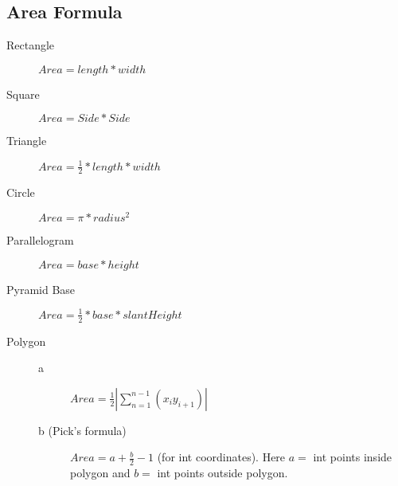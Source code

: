 \documentclass[10pt, a4paper]{article}
\begin{document}
\begin{multicols}{2}
\subsection{Area Formula}
\begin{description}
    \item[Rectangle] 
        \begin{math}
            Area = length * width
        \end{math}
    \item[Square] 
        \begin{math}
            Area = Side * Side
        \end{math}
    \item[Triangle] 
        \begin{math}
            Area = \frac{1}{2} * length * width
        \end{math}
    \item[Circle] 
        \begin{math}
            Area = \pi * radius^2
        \end{math}
    \item[Parallelogram] 
        \begin{math}
            Area = base * height
        \end{math}
    \item[Pyramid Base] 
        \begin{math}
            Area = \frac{1}{2} * base * slantHeight
        \end{math}
    \item[Polygon] \hfill
        \begin{description}
            \item[a] 
            \begin{math}
                Area = \frac{1}{2}|\sum_{n=1}^{n-1}(x_iy_{i+1})|
            \end{math}

            \item[b (Pick's formula)] 
            \begin{math}
                Area = a + \frac{b}{2} - 1
            \end{math}
            (for int coordinates). Here $a=$ int points inside polygon and $b=$ int points outside polygon. 
        \end{description}
        
\end{description}

\end{multicols}
\end{document}

